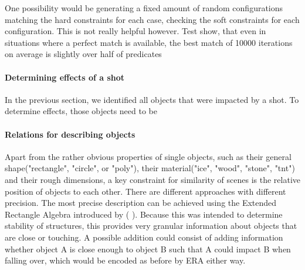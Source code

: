 One possibility would be generating a fixed amount of random configurations matching the hard constraints for each case, checking the soft constraints for each configuration. This is not really helpful however. Test show, that even in situations where a perfect match is available, the best match of 10000 iterations on average is slightly over half of predicates %


\paragraph{Determining effects of a shot}
In the previous section, we identified all objects that were impacted by a shot.
To determine effects, those objects need to be

\paragraph{Relations for describing objects}
Apart from the rather obvious properties of single objects, such as their general shape("rectangle", "circle", or "poly"), their material("ice", "wood", "stone", "tnt") and their rough dimensions, a key constraint for similarity of scenes is the relative position of objects to each other.
There are different approaches with different precision.
The most precise description can be achieved using the Extended Rectangle Algebra introduced by (%
). Because this was intended to determine stability of structures, this provides very granular information about objects that are close or touching.
A possible addition could consist of adding information whether object A is close enough to object B such that A could impact B when falling over, which would be encoded as before by ERA either way.

